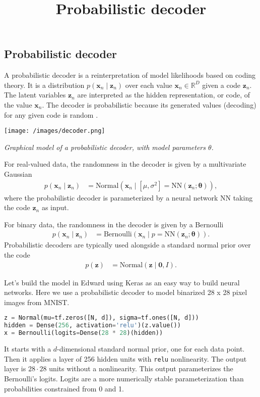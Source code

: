 \title{Probabilistic decoder}

\subsection{Probabilistic decoder}

A probabilistic decoder is a reinterpretation of model likelihoods
based on coding theory. It is a distribution $p(\mathbf{x}_n\mid \mathbf{z}_n)$  over each value
$\mathbf{x}_n\in\mathbb{R}^D$ given a code $\mathbf{z}_n$. The latent
variables $\mathbf{z}_n$ are interpreted as the hidden representation, or code, of the value
$\mathbf{x}_n$. The decoder is probabilistic because its generated
values (decoding) for any given code is random
\citep{dayan1995helmholtz}.

\texttt{[image: /images/decoder.png]}

{\small\textit{Graphical model of a probabilistic decoder, with model
parameters $\theta$.}}

For real-valued data,
the randomness in the decoder is given by a multivariate Gaussian
\begin{align*}
  p(\mathbf{x}_n\mid\mathbf{z}_n)
  &=
  \text{Normal}(\mathbf{x}_n\mid [\mu,\sigma^2]=\mathrm{NN}(\mathbf{z}_n; \mathbf{\theta})),
\end{align*}
where the probabilistic decoder is parameterized by a neural network
$\mathrm{NN}$ taking the code $\mathbf{z}_n$ as input.

For binary data,
the randomness in the decoder is given by a Bernoulli
\begin{align*}
  p(\mathbf{x}_n\mid\mathbf{z}_n)
  &=
  \text{Bernoulli}(\mathbf{x}_n\mid p=\mathrm{NN}(\mathbf{z}_n; \mathbf{\theta})).
\end{align*}
Probabilistic decoders are typically used alongside a standard normal
prior over the code
\begin{align*}
  p(\mathbf{z})
  &=
  \text{Normal}(\mathbf{z} \mid \mathbf{0}, I).
\end{align*}

Let's build the model in Edward using
Keras as an easy way to build neural networks. Here we use a
probabilistic decoder to model binarized 28 x 28
pixel images from MNIST.
\begin{lstlisting}[language=Python]
z = Normal(mu=tf.zeros([N, d]), sigma=tf.ones([N, d]))
hidden = Dense(256, activation='relu')(z.value())
x = Bernoulli(logits=Dense(28 * 28)(hidden))
\end{lstlisting}
It starts with a $d$-dimensional standard normal prior, one for each
data point. Then it applies a layer of 256 hidden units with
\texttt{relu} nonlinearity. The output layer is $28\cdot 28$ units
without a nonlinearity. This output
parameterizes the Bernoulli's logits. Logits are a more numerically stable
parameterization than probabilities constrained
from 0 and 1.

